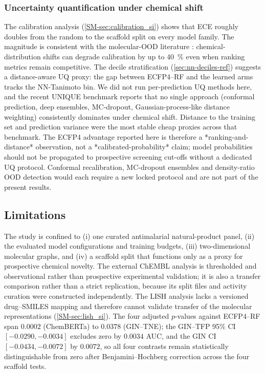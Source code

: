 \documentclass[11pt,a4paper]{article}
\begin{document}
\subsubsection{Uncertainty quantification under chemical shift}

The calibration analysis (\cref{SM-sec:calibration_si}) shows that ECE roughly doubles from the random to the scaffold split on every model family. The magnitude is consistent with the molecular-OOD literature \citep{sheridan2024realworld}: chemical-distribution shifts can degrade calibration by up to \qty{40}{\percent} even when ranking metrics remain competitive. The decile stratification (\cref{sec:nn-deciles-ref}) suggests a distance-aware UQ proxy: the gap between ECFP4--RF and the learned arms tracks the NN-Tanimoto bin. We did not run per-prediction UQ methods here, and the recent UNIQUE benchmark \citep{unique2026uq} reports that no single approach (conformal prediction, deep ensembles, MC-dropout, Gaussian-process-like distance weighting) consistently dominates under chemical shift. Distance to the training set and prediction variance were the most stable cheap proxies across that benchmark. The ECFP4 advantage reported here is therefore a *ranking-and-distance* observation, not a *calibrated-probability* claim; model probabilities should not be propagated to prospective screening cut-offs without a dedicated UQ protocol. Conformal recalibration, MC-dropout ensembles and density-ratio OOD detection would each require a new locked protocol and are not part of the present results.

\subsection{Limitations}

The study is confined to (i) one curated antimalarial natural-product panel, (ii) the evaluated model configurations and training budgets, (iii) two-dimensional molecular graphs, and (iv) a scaffold split that functions only as a proxy for prospective chemical novelty. The external ChEMBL analysis is thresholded and observational rather than prospective experimental validation; it is also a transfer comparison rather than a strict replication, because its split files and activity curation were constructed independently. The LISH analysis lacks a versioned drug--SMILES mapping and therefore cannot validate transfer of the molecular representations (\cref{SM-sec:lish_si}). The four adjusted $p$-values against ECFP4--RF span $\num{0.0002}$ (ChemBERTa) to $\num{0.0378}$ (GIN--TNE); the GIN--TFP 95\% CI $[-\num{0.0290}, -\num{0.0034}]$ excludes zero by $\num{0.0034}$ AUC, and the GIN CI $[-\num{0.0434}, -\num{0.0072}]$ by $\num{0.0072}$, so all four contrasts remain statistically distinguishable from zero after Benjamini--Hochberg correction across the four scaffold tests.
\end{document}
